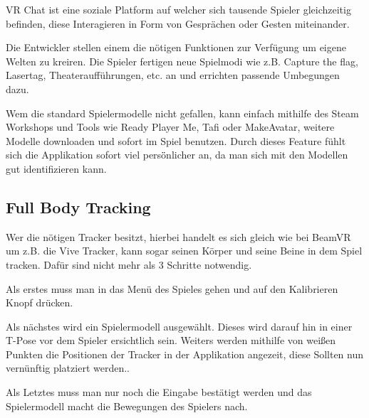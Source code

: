 VR Chat ist eine soziale Platform auf welcher sich tausende Spieler gleichzeitig befinden, diese Interagieren in Form von Gespr\"achen oder Gesten miteinander.

Die Entwickler stellen einem die n\"otigen Funktionen zur Verf\"ugung um eigene Welten zu kreiren. Die Spieler fertigen neue Spielmodi wie z.B. Capture the flag, Lasertag, Theaterauff\"uhrungen, etc. an und errichten passende Umbegungen dazu.

Wem die standard Spielermodelle nicht gefallen, kann einfach mithilfe des Steam Workshops und Tools wie Ready Player Me, Tafi oder MakeAvatar, weitere Modelle downloaden und sofort im Spiel benutzen.
Durch dieses Feature f\"uhlt sich die Applikation sofort viel pers\"önlicher an, da man sich mit den Modellen gut identifizieren kann.
~\cite{VRChat_2021_AvatarCreator}

\subsection{Full Body Tracking}
\label{sec:vrchat_fullbodytracking}
Wer die n\"otigen Tracker besitzt, hierbei handelt es sich gleich wie bei BeamVR um z.B. die Vive Tracker, kann sogar seinen K\"orper und seine Beine in dem Spiel tracken.
Dafür sind nicht mehr als 3 Schritte notwendig.
~\cite{VRChat_2021_FullBodyTracking}

Als erstes muss man in das Men\"u des Spieles gehen und auf den Kalibrieren Knopf dr\"ucken.

Als n\"achstes wird ein Spielermodell ausgew\"ahlt.
Dieses wird darauf hin in einer T-Pose vor dem Spieler ersichtlich sein.
Weiters werden mithilfe von weißen Punkten die Positionen der Tracker in der Applikation angezeit, diese Sollten nun vern\"unftig platziert werden..

Als Letztes muss man nur noch die Eingabe best\"atigt werden und das Spielermodell macht die Bewegungen des Spielers nach.

